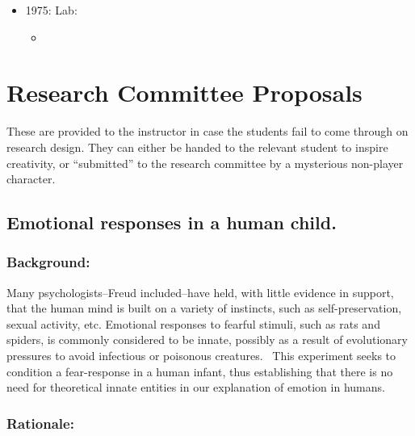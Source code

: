 \begin{refsection}
\begin{itemize}
\begin{itemize}
\item ~\citep{Spitzer:1974gm}

\end{itemize}

\item 1975: Lab: 

\begin{itemize}
\item ~\citep{Thesmallworldprob:1967jc}

\end{itemize}

\end{itemize}

\pagebreak 

\section{Research Committee Proposals}
\label{researchcommitteeproposals}

These are provided to the instructor in case the students fail to come through on research design. They can either be handed to the relevant student to inspire creativity, or “submitted” to the research committee by a mysterious non-player character.

\newpage

\subsection{Emotional responses in a human child.}
\label{emotionalresponsesinahumanchild.}

\subsubsection{Background:}
\label{background:}

Many psychologists--Freud included--have held, with little evidence in support, that the human mind is built on a variety of instincts, such as self-preservation, sexual activity, etc. Emotional responses to fearful stimuli, such as rats and spiders, is commonly considered to be innate, possibly as a result of evolutionary pressures to avoid infectious or poisonous creatures.  This experiment seeks to condition a fear-response in a human infant, thus establishing that there is no need for theoretical innate entities in our explanation of emotion in humans.

\subsubsection{Rationale:}
\label{rationale:}


\end{refsection}
